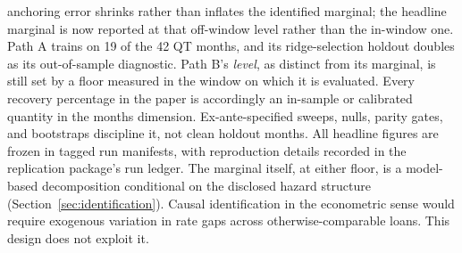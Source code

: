 \documentclass[12pt]{article}
\begin{document}
anchoring error shrinks rather than inflates the identified marginal; the headline marginal is now reported at that off-window level rather than the in-window one. Path A trains on 19 of the 42 QT months, and its ridge-selection holdout doubles as its out-of-sample diagnostic. Path B's \emph{level}, as distinct from its marginal, is still set by a floor measured in the window on which it is evaluated. Every recovery percentage in the paper is accordingly an in-sample or calibrated quantity in the months dimension. Ex-ante-specified sweeps, nulls, parity gates, and bootstraps discipline it, not clean holdout months. All headline figures are frozen in tagged run manifests, with reproduction details recorded in the replication package's run ledger. The marginal itself, at either floor, is a model-based decomposition conditional on the disclosed hazard structure (Section~\ref{sec:identification}). Causal identification in the econometric sense would require exogenous variation in rate gaps across otherwise-comparable loans. This design does not exploit it.
\end{document}
